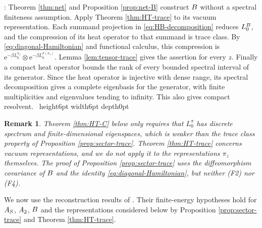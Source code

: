 \documentclass[leqno]{article}
\let\cal\relax
\newcommand{\cal}{\mathcal}
\newcommand{\qed}{\hfill \vrule height6pt  width6pt depth0pt}
\newcommand{\ot}{\otimes}
\newcommand{\e}{\mathrm{e}}
\newtheorem{remark}[thm]{Remark}
\newenvironment{proof}[1][]{\noindent {\it Proof #1} : }{\hbox{~}\qed
\smallskip
}
\numberwithin{equation}{section}
\begin{document}
\begin{proof}
Theorem \ref{thm:net} and Proposition \ref{prop:net-B} construct $\cal B$ without a spectral finiteness assumption. Apply Theorem \ref{thm:HT-trace} to its vacuum representation. Each summand projection in \eqref{eq:HB-decomposition} reduces $L_0^{\cal B}$, and the compression of its heat operator to that summand is trace class. By \eqref{eq:diagonal-Hamiltonian} and functional calculus, this compression is $\e^{-\beta L_0^{\pi_z}}\ot\e^{-\beta L_0^{\sigma(\pi_z)}}$. Lemma \ref{lem:tensor-trace} gives the assertion for every $z$. Finally a compact heat operator bounds the rank of every bounded spectral interval of its generator. Since the heat operator is injective with dense range, its spectral decomposition gives a complete eigenbasis for the generator, with finite multiplicities and eigenvalues tending to infinity. This also gives compact resolvent.
\end{proof}

\begin{remark}\normalfont
\label{rem:status-D}
Theorem \ref{thm:HT-C} below only requires that $L_0^\pi$ has discrete spectrum and finite-dimensional eigenspaces, which is weaker than the trace class property of Proposition \ref{prop:sector-trace}. Theorem \ref{thm:HT-trace} concerns vacuum representations, and we do not apply it to the representations $\pi_z$ themselves. The proof of Proposition \ref{prop:sector-trace} uses the diffeomorphism covariance of $\cal B$ and the identity \eqref{eq:diagonal-Hamiltonian}, but neither \textup{(F2)} nor \textup{(F4)}.
\end{remark}

We now use the reconstruction results of \cite{HeT25}. Their finite-energy hypotheses hold for $\cal A_S$, $\cal A_2$, $\cal B$ and the representations considered below by Proposition \ref{prop:sector-trace} and Theorem \ref{thm:HT-trace}.
\end{document}
